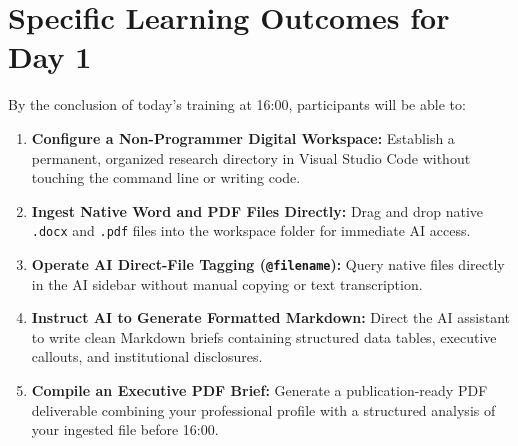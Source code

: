 \documentclass[11pt, a4paper]{report}
\begin{document}
\section{Specific Learning Outcomes for Day 1}
By the conclusion of today's training at 16:00, participants will be able to:
\begin{enumerate}[label=\textbf{1.\arabic*}]
    \item \textbf{Configure a Non-Programmer Digital Workspace:} Establish a permanent, organized research directory in Visual Studio Code without touching the command line or writing code.
    \item \textbf{Ingest Native Word and PDF Files Directly:} Drag and drop native \texttt{.docx} and \texttt{.pdf} files into the workspace folder for immediate AI access.
    \item \textbf{Operate AI Direct-File Tagging (\texttt{@filename}):} Query native files directly in the AI sidebar without manual copying or text transcription.
    \item \textbf{Instruct AI to Generate Formatted Markdown:} Direct the AI assistant to write clean Markdown briefs containing structured data tables, executive callouts, and institutional disclosures.
    \item \textbf{Compile an Executive PDF Brief:} Generate a publication-ready PDF deliverable combining your professional profile with a structured analysis of your ingested file before 16:00.
\end{enumerate}
\end{document}
